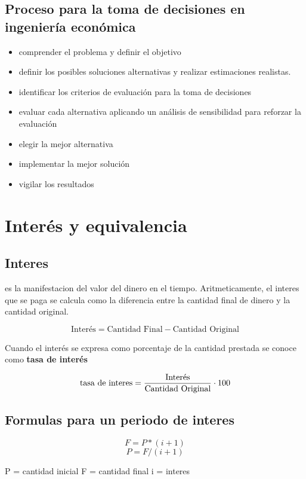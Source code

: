 \documentclass[11pt]{article}
\begin{document}
\subsection*{Proceso para la toma de decisiones en ingeniería económica}
\label{sec:org6c7d713}
\begin{itemize}
\item comprender el problema y definir el objetivo
\item definir los posibles soluciones alternativas y realizar estimaciones realistas.
\item identificar los criterios de evaluación para la toma de decisiones
\item evaluar cada alternativa aplicando un análisis de sensibilidad para reforzar la evaluación
\item elegir la mejor alternativa
\item implementar la mejor solución
\item vigilar los resultados
\end{itemize}


\section*{Interés y equivalencia}
\label{sec:orga8e7a5a}
\subsection*{Interes}
\label{sec:org673c050}
es la manifestacion del valor del dinero en el tiempo. Aritmeticamente, el interes que se paga se calcula como la diferencia entre la cantidad final de dinero y la cantidad original.

\[
\text{Interés} = \text{Cantidad Final} - \text{Cantidad Original}
\]

Cuando el interés se expresa como porcentaje de la cantidad prestada se conoce como \textbf{tasa de interés} 

\[
\text{\text{tasa de interes}} = \frac{\text{Interés}}{\text{Cantidad Original}} \cdot 100
\]

\subsection*{Formulas para un periodo de interes}
\label{sec:org77858e9}
\begin{mdframed}
\[ F = P*(i+1) \]
\[ P = F/(i+1) \]

P = cantidad inicial
F = cantidad final 
i = interes
\end{mdframed}
\end{document}
